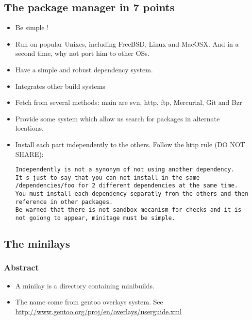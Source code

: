 \documentclass[letterpaper,10pt,english]{sphinxmanual}
\begin{document}
\subsection{The package manager in 7 points}
\label{spec:the-package-manager-in-7-points}\begin{itemize}
\item {} 
Be simple !

\item {} 
Run on popular Unixes, including FreeBSD, Linux and MacOSX. And in a second time, why not port him to other OSs.

\item {} 
Have a simple and robust dependency system.

\item {} 
Integrates other build systems

\item {} 
Fetch from several methods: main are svn, http, ftp, Mercurial, Git and Bzr

\item {} 
Provide some system which allow us search for packages in alternate locations.

\item {} 
Install each part independently to the others. Follow the http rule (DO NOT SHARE):

\begin{Verbatim}[commandchars=@\[\]]
Independently is not a synonym of not using another dependency.
It s just to say that you can not install in the same /dependencies/foo for 2 different dependencies at the same time.
You must install each dependency separatly from the others and then reference in other packages.
Be warned that there is not sandbox mecanism for checks and it is not goiong to appear, minitage must be simple.
\end{Verbatim}

\end{itemize}


\subsection{The minilays}
\label{spec:the-minilays}

\subsubsection{Abstract}
\label{spec:abstract}\begin{itemize}
\item {} 
A minilay is a directory containing minibuilds.

\item {} 
The name come from gentoo overlays system. See \href{http://www.gentoo.org/proj/en/overlays/userguide.xml}{http://www.gentoo.org/proj/en/overlays/userguide.xml}

\end{itemize}
\end{document}
